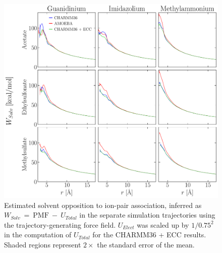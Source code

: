 \documentclass[journal=jacsat,articletitle=true,manuscript=suppinfo,layout=onecolumn]{achemso}
\begin{document}
    \begin{figure}[H]
    \begin{center}
        \includegraphics[width=1\columnwidth]{images/energy_conts_w_solv.pdf}
        \caption{Estimated solvent opposition to ion-pair association, inferred as $W_{Solv}~=~\text{PMF}~-~U_{Total}$ in the separate simulation trajectories using the trajectory-generating force field. $U_{Elect}$ was scaled up by $1/0.75^2$ in the computation of $U_{Total}$ for the CHARMM36 + ECC results. Shaded regions represent $2\times$ the standard error of the mean.}
        \label{fig:energy_conts_w_solv}
    \end{center}
    \end{figure}
    
\end{document}
